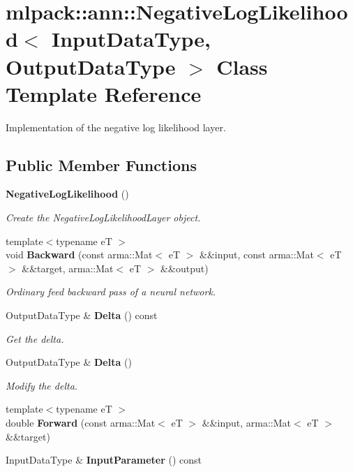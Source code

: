 \section{mlpack\+:\+:ann\+:\+:Negative\+Log\+Likelihood$<$ Input\+Data\+Type, Output\+Data\+Type $>$ Class Template Reference}
\label{classmlpack_1_1ann_1_1NegativeLogLikelihood}


Implementation of the negative log likelihood layer.  


\subsection*{Public Member Functions}
\begin{DoxyCompactItemize}
\item 
{\bf Negative\+Log\+Likelihood} ()
\begin{DoxyCompactList}\small\item\em Create the Negative\+Log\+Likelihood\+Layer object. \end{DoxyCompactList}\item 
{\footnotesize template$<$typename eT $>$ }\\void {\bf Backward} (const arma\+::\+Mat$<$ eT $>$ \&\&input, const arma\+::\+Mat$<$ eT $>$ \&\&target, arma\+::\+Mat$<$ eT $>$ \&\&output)
\begin{DoxyCompactList}\small\item\em Ordinary feed backward pass of a neural network. \end{DoxyCompactList}\item 
Output\+Data\+Type \& {\bf Delta} () const 
\begin{DoxyCompactList}\small\item\em Get the delta. \end{DoxyCompactList}\item 
Output\+Data\+Type \& {\bf Delta} ()
\begin{DoxyCompactList}\small\item\em Modify the delta. \end{DoxyCompactList}\item 
{\footnotesize template$<$typename eT $>$ }\\double {\bf Forward} (const arma\+::\+Mat$<$ eT $>$ \&\&input, arma\+::\+Mat$<$ eT $>$ \&\&target)
\item 
Input\+Data\+Type \& {\bf Input\+Parameter} () const 

\end{DoxyCompactItemize}
